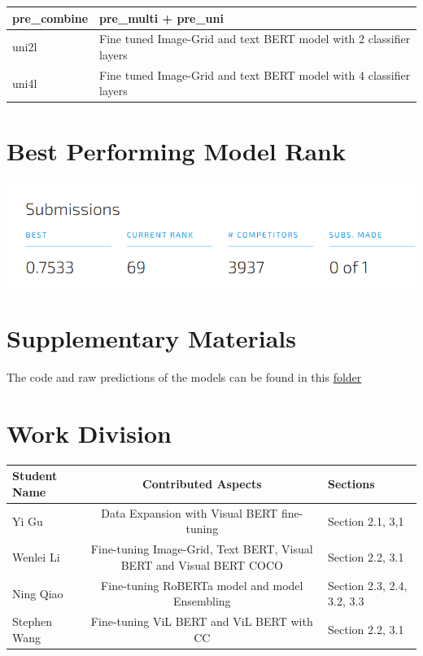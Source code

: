 \documentclass[10pt,twocolumn,letterpaper]{article}
\begin{document}
\begin{table}[h]
\begin{center}
\begin{tabular}{|l|l|}
\hline
pre\_combine  & pre\_multi + pre\_uni                                                                                                                                                          \\ 
\hline
uni2l         & \textcolor[rgb]{0.141,0.161,0.18}{Fine tuned Image-Grid and text BERT model with 2 classifier layers}                                                                          \\ 
\hline
uni4l         & \textcolor[rgb]{0.141,0.161,0.18}{Fine tuned Image-Grid and text BERT model with 4 classifier layers}                                                                          \\
\hline
\end{tabular}
\end{center}
\end{table}


\section{Best Performing Model Rank}
\includegraphics[scale=0.6]{images/ranking.png}

\section{Supplementary Materials}
The code and raw predictions of the models can be found in this \href{https://drive.google.com/drive/folders/1ftH9FxO2Fn0r1WsAlvrzcWtSMJiozbNp?usp=sharing}{folder}

\section{Work Division}
\begin{table}[h]
\begin{center}
\begin{tabular}{|l|c|p{5cm}|}
\hline
Student Name & Contributed Aspects & Sections\\
\hline\hline
Yi Gu & Data Expansion with Visual BERT fine-tuning & Section 2.1, 3,1\\
Wenlei Li & Fine-tuning Image-Grid, Text BERT, Visual BERT and Visual BERT COCO& Section 2.2, 3.1\\
Ning Qiao & Fine-tuning RoBERTa model and model Ensembling & Section 2.3, 2.4, 3.2, 3.3 \\
Stephen Wang & Fine-tuning ViL BERT and ViL BERT with CC & Section 2.2, 3.1 \\
\hline
\end{tabular}
\end{center}
\label{tab:contributions}
\end{table}

\end{document}
